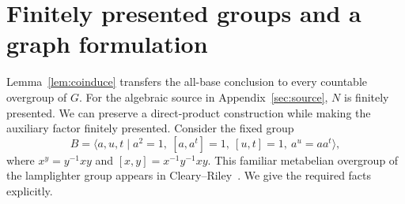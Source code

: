 \documentclass[11pt,a4paper]{article}
\numberwithin{equation}{section}
\begin{document}
\section{Finitely presented groups and a graph formulation}\label{sec:graph}

Lemma~\ref{lem:coinduce} transfers the all-base conclusion to every
countable overgroup of $G$. For the algebraic source in
Appendix~\ref{sec:source}, $N$ is finitely presented. We can preserve a
direct-product construction while making the auxiliary factor finitely
presented. Consider the fixed group
\[
 B=\langle a,u,t\mid
 a^2=1,\ [a,a^t]=1,\ [u,t]=1,\ a^u=aa^t\rangle,
\]
where $x^y=y^{-1}xy$ and $[x,y]=x^{-1}y^{-1}xy$.
This familiar metabelian overgroup of the lamplighter group appears in
Cleary--Riley~\cite{CR}. We give the required facts explicitly.
\end{document}
